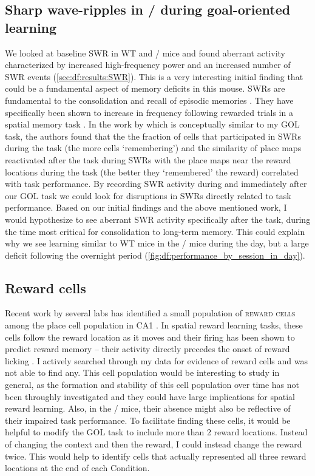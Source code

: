 \subsection{Sharp wave-ripples in \df/ during goal-oriented learning}
We looked at baseline \ac{SWR} in WT and \df/ mice and found aberrant activity characterized by increased high-frequency power and an increased number of \ac{SWR} events (\autoref{sec:df:results:SWR}).
This is a very interesting initial finding that could be a fundamental aspect of memory deficits in this mouse.
SWRs are fundamental to the consolidation and recall of episodic memories \citep[reviewd in,][]{Buzsaki2015}.
They have specifically been shown to increase in frequency following rewarded trials in a spatial memory task \citep{Singer2009}.
In the work by \citeauthor{Dupret2010a} which is conceptually similar to my \ac{GOL} task, the authors found that the the fraction of cells that participated in SWRs during the task (the more cells `remembering') and the similarity of place maps reactivated after the task during SWRs with the place maps near the reward locations during the task (the better they `remembered' the reward) correlated with task performance.
By recording \ac{SWR} activity during and immediately after our \ac{GOL} task we could  look for disruptions in SWRs directly related to task performance.
Based on our initial findings and the above mentioned work, I would hypothesize to see aberrant \ac{SWR} activity specifically after the task, during the time most critical for consolidation to long-term memory.
This could explain why we see learning similar to WT mice in the \df/ mice during the day, but a large deficit following the overnight period (\autoref{fig:df:performance_by_session_in_day}).

\subsection{Reward cells}
Recent work by several labs has identified a small population of \textsc{reward cells} among the place cell population in CA1 \citep{XXXX}.
In spatial reward learning tasks, these cells follow the reward location as it moves and their firing has been shown to predict reward memory -- their activity directly precedes the onset of reward licking \citep{XXXX}.
I actively searched through my data for evidence of reward cells and was not able to find any.
This cell population would be interesting to study in general, as the formation and stability of this cell population over time has not been throughly investigated and they could have large implications for spatial reward learning.
Also, in the \df/ mice, their absence might also be reflective of their impaired task performance.
To facilitate finding these cells, it would be helpful to modify the \ac{GOL} task to include more than 2 reward locations.
Instead of changing the context and then the reward, I could instead change the reward twice.
This would help to identify cells that actually represented all three reward locations at the end of each Condition.


